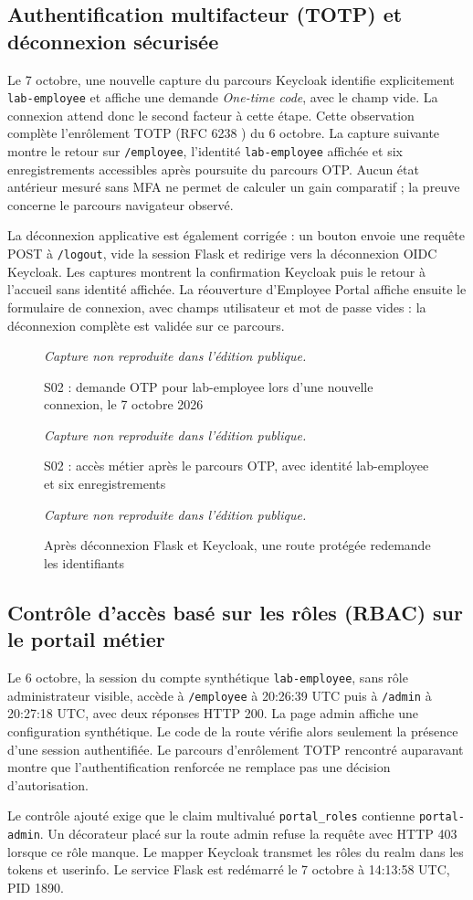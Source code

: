 \documentclass[a4paper,12pt]{report}
\newcommand{\publiccapture}[1]{%
  \begin{figure}[H]\centering
  {\footnotesize\itshape Capture non reproduite dans l'édition publique.}
  \caption{#1}\end{figure}}
\begin{document}
\subsection{Authentification multifacteur (TOTP) et déconnexion sécurisée}
Le 7 octobre, une nouvelle capture du parcours Keycloak identifie explicitement \texttt{lab-employee} et affiche une demande \emph{One-time code}, avec le champ vide. La connexion attend donc le second facteur à cette étape. Cette observation complète l'enrôlement TOTP (RFC 6238 \cite{rfc6238}) du 6 octobre. La capture suivante montre le retour sur \texttt{/employee}, l'identité \texttt{lab-employee} affichée et six enregistrements accessibles après poursuite du parcours OTP. Aucun état antérieur mesuré sans MFA ne permet de calculer un gain comparatif ; la preuve concerne le parcours navigateur observé.

La déconnexion applicative est également corrigée : un bouton envoie une requête POST à \texttt{/logout}, vide la session Flask et redirige vers la déconnexion OIDC Keycloak. Les captures montrent la confirmation Keycloak puis le retour à l'accueil sans identité affichée. La réouverture d'Employee Portal affiche ensuite le formulaire de connexion, avec champs utilisateur et mot de passe vides : la déconnexion complète est validée sur ce parcours.

\publiccapture{S02 : demande OTP pour lab-employee lors d'une nouvelle connexion, le 7 octobre 2026}
\publiccapture{S02 : accès métier après le parcours OTP, avec identité lab-employee et six enregistrements}
\publiccapture{Après déconnexion Flask et Keycloak, une route protégée redemande les identifiants}

\subsection{Contrôle d'accès basé sur les rôles (RBAC) sur le portail métier}
Le 6 octobre, la session du compte synthétique \texttt{lab-employee}, sans rôle administrateur visible, accède à \texttt{/employee} à 20:26:39 UTC puis à \texttt{/admin} à 20:27:18 UTC, avec deux réponses HTTP 200. La page admin affiche une configuration synthétique. Le code de la route vérifie alors seulement la présence d'une session authentifiée. Le parcours d'enrôlement TOTP rencontré auparavant montre que l'authentification renforcée ne remplace pas une décision d'autorisation.

Le contrôle ajouté exige que le claim multivalué \texttt{portal\_roles} contienne \texttt{portal-admin}. Un décorateur placé sur la route admin refuse la requête avec HTTP 403 lorsque ce rôle manque. Le mapper Keycloak transmet les rôles du realm dans les tokens et userinfo. Le service Flask est redémarré le 7 octobre à 14:13:58 UTC, PID 1890.
\end{document}

